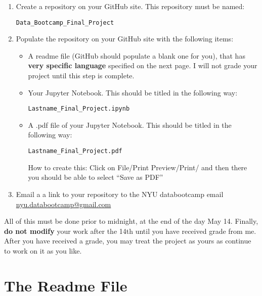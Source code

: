 \begin{enumerate}

\item Create a repository on your GitHub site. This repository must be named:

 {\tt Data\_Bootcamp\_Final\_Project}

 \bigskip

\item Populate the repository on your GitHub site with the following items:
\begin{itemize}

\item A readme file (GitHub should populate a blank one for you), that has \textbf{very specific language} specified on the next page. I will not grade your project until this step is complete.

\bigskip

\item Your Jupyter Notebook. This should be titled in the following way:

 {\tt Lastname\_Final\_Project.ipynb}

\bigskip

\item A .pdf file of your Jupyter Notebook. This should be titled in the following way:

 {\tt Lastname\_Final\_Project.pdf}

How to create this: Click on File/Print Preview/Print/ and then there you should be able to select ``Save as PDF''

\end{itemize}

\bigskip

\item Email a a link to your repository to the NYU databootcamp email \href{mailto:nyu.databootcamp@gmail.com}{nyu.databootcamp@gmail.com}

\end{enumerate}

All of this must be done prior to midnight, at the end of the day May 14. Finally, \textbf{do not modify} your work after the 14th until you have received grade from me. After you have received a grade, you may treat the project as yours as continue to work on it as you like.

\section*{The Readme File}

